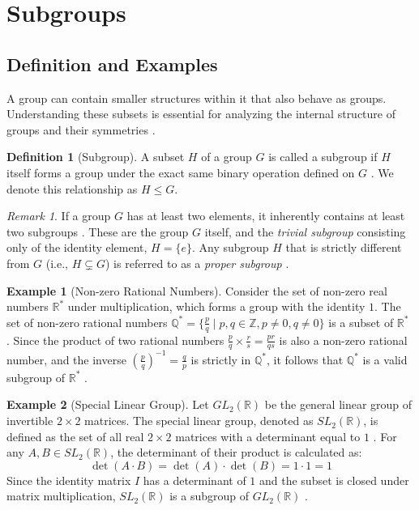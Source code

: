 \documentclass[11pt]{article}
\theoremstyle{definition}
\newtheorem{definition}{Definition}[section]
\newtheorem{example}{Example}[section]
\theoremstyle{plain}
\theoremstyle{remark}
\newtheorem*{remark}{Remark}
\begin{document}
\section{Subgroups}

\subsection{Definition and Examples}

A group can contain smaller structures within it that also behave as groups. Understanding these subsets is essential for analyzing the internal structure of groups and their symmetries \cite{fraleigh}.

\begin{definition}[Subgroup]
A subset $H$ of a group $G$ is called a subgroup if $H$ itself forms a group under the exact same binary operation defined on $G$ \cite{dummit}. We denote this relationship as $H \leq G$.
\end{definition}

\begin{remark}
If a group $G$ has at least two elements, it inherently contains at least two subgroups \cite{fraleigh}. These are the group $G$ itself, and the \emph{trivial subgroup} consisting only of the identity element, $H = \{e\}$. Any subgroup $H$ that is strictly different from $G$ (i.e., $H \subsetneq G$) is referred to as a \emph{proper subgroup} \cite{gallian}.
\end{remark}

\begin{example}[Non-zero Rational Numbers]
Consider the set of non-zero real numbers $\mathbb{R}^*$ under multiplication, which forms a group with the identity $1$. The set of non-zero rational numbers $\mathbb{Q}^* = \{\frac{p}{q} \mid p, q \in \mathbb{Z}, p \neq 0, q \neq 0\}$ is a subset of $\mathbb{R}^*$ \cite{gallian}. Since the product of two rational numbers $\frac{p}{q} \times \frac{r}{s} = \frac{pr}{qs}$ is also a non-zero rational number, and the inverse $(\frac{p}{q})^{-1} = \frac{q}{p}$ is strictly in $\mathbb{Q}^*$, it follows that $\mathbb{Q}^*$ is a valid subgroup of $\mathbb{R}^*$ \cite{dummit}.
\end{example}

\begin{example}[Special Linear Group]
Let $GL_2(\mathbb{R})$ be the general linear group of invertible $2 \times 2$ matrices. The special linear group, denoted as $SL_2(\mathbb{R})$, is defined as the set of all real $2 \times 2$ matrices with a determinant equal to $1$ \cite{dummit}. For any $A, B \in SL_2(\mathbb{R})$, the determinant of their product is calculated as:
\begin{equation}
    \det(A \cdot B) = \det(A) \cdot \det(B) = 1 \cdot 1 = 1
\end{equation}
Since the identity matrix $I$ has a determinant of $1$ and the subset is closed under matrix multiplication, $SL_2(\mathbb{R})$ is a subgroup of $GL_2(\mathbb{R})$ \cite{gallian}.
\end{example}
\end{document}
